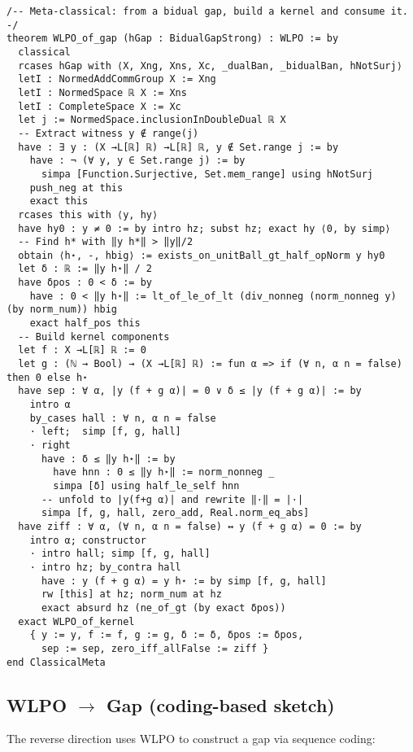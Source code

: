 \documentclass[11pt]{article}
\begin{document}
\begin{lstlisting}[caption={Meta-classical: from bidual gap to WLPO},label={lst:bridge}]
/-- Meta-classical: from a bidual gap, build a kernel and consume it. -/
theorem WLPO_of_gap (hGap : BidualGapStrong) : WLPO := by
  classical
  rcases hGap with ⟨X, Xng, Xns, Xc, _dualBan, _bidualBan, hNotSurj⟩
  letI : NormedAddCommGroup X := Xng
  letI : NormedSpace ℝ X := Xns
  letI : CompleteSpace X := Xc
  let j := NormedSpace.inclusionInDoubleDual ℝ X
  -- Extract witness y ∉ range(j)
  have : ∃ y : (X →L[ℝ] ℝ) →L[ℝ] ℝ, y ∉ Set.range j := by
    have : ¬ (∀ y, y ∈ Set.range j) := by
      simpa [Function.Surjective, Set.mem_range] using hNotSurj
    push_neg at this
    exact this
  rcases this with ⟨y, hy⟩
  have hy0 : y ≠ 0 := by intro hz; subst hz; exact hy ⟨0, by simp⟩
  -- Find h* with ‖y h*‖ > ‖y‖/2
  obtain ⟨h⋆, -, hbig⟩ := exists_on_unitBall_gt_half_opNorm y hy0
  let δ : ℝ := ‖y h⋆‖ / 2
  have δpos : 0 < δ := by
    have : 0 < ‖y h⋆‖ := lt_of_le_of_lt (div_nonneg (norm_nonneg y) (by norm_num)) hbig
    exact half_pos this
  -- Build kernel components
  let f : X →L[ℝ] ℝ := 0
  let g : (ℕ → Bool) → (X →L[ℝ] ℝ) := fun α => if (∀ n, α n = false) then 0 else h⋆
  have sep : ∀ α, |y (f + g α)| = 0 ∨ δ ≤ |y (f + g α)| := by
    intro α
    by_cases hall : ∀ n, α n = false
    · left;  simp [f, g, hall]
    · right
      have : δ ≤ ‖y h⋆‖ := by
        have hnn : 0 ≤ ‖y h⋆‖ := norm_nonneg _
        simpa [δ] using half_le_self hnn
      -- unfold to |y(f+g α)| and rewrite ‖·‖ = |·|
      simpa [f, g, hall, zero_add, Real.norm_eq_abs]
  have ziff : ∀ α, (∀ n, α n = false) ↔ y (f + g α) = 0 := by
    intro α; constructor
    · intro hall; simp [f, g, hall]
    · intro hz; by_contra hall
      have : y (f + g α) = y h⋆ := by simp [f, g, hall]
      rw [this] at hz; norm_num at hz
      exact absurd hz (ne_of_gt (by exact δpos))
  exact WLPO_of_kernel
    { y := y, f := f, g := g, δ := δ, δpos := δpos, 
      sep := sep, zero_iff_allFalse := ziff }
end ClassicalMeta
\end{lstlisting}

\subsection{WLPO $\to$ Gap (coding-based sketch)}

The reverse direction uses WLPO to construct a gap via sequence coding:
\end{document}
